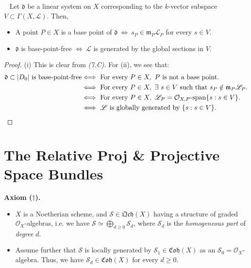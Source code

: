 \documentclass[11pt,a4paper,footinclude=true,headinclude=true]{scrbook} %
\newcommand{\LL}{\mathscr{L}}
\newcommand{\OO}{\mathcal{O}}
\newcommand{\Ss}{\mathscr{S}}
\newcommand{\dd}{\mathfrak{d}}
\newcommand{\mm}{\mathfrak{m}}
\newcommand{\<}{\langle}
\newcommand{\>}{\rangle}
\newcommand{\spn}{\mathchar`-\mathrm{span}}
\newcommand{\qcoh}{\mathfrak{Qch}}
\newcommand{\coh}{\mathfrak{Coh}}
\newenvironment{lemma}[2][]
{\renewcommand\theinnercustomlemma{#2}\innercustomlemma[#1]
\begin{mdframed}[backgroundcolor=gray!20]\ }
{\end{mdframed}\endinnercustomprop}
\newenvironment{axiom}[2][Axiom]
    { \begin{mdframed}[backgroundcolor=red!20] \textbf{#1 #2.} }
    {  \end{mdframed}}
\begin{document}
\begin{lemma}{7.8}
    Let $\dd$ be a linear system on $X$ corresponding to the $k$-vector subspace $V\subset\Gamma(X,\LL)$. Then,
    \begin{itemize}
        \item[(i)] A point $P\in X$ is a base point of $\dd\ \Longleftrightarrow\ s_P\in\mm_P\LL_P$ for every $s\in V$.
        \item[(ii)] $\dd$ is base-point-free  $\Longleftrightarrow\ \LL$ is generated by the global sections in $V$.
    \end{itemize}
\end{lemma}
\begin{proof}
    (i) This is clear from \textit{(7.C)}. For (ii), we see that:
    \begin{align*}
        \dd\subset|D_0|\ \text{is base-point-free} &\Longleftrightarrow\ \text{For every}\ P\in X,\ P\ \text{is not a base point}.\\  &\Longleftrightarrow\ \text{For every}\ P\in X,\ \exists\ s\in V\ \text{such that}\ s_P\notin\mm_P\LL_P.\\  &\Longleftrightarrow\ \text{For every}\ P\in X,\ \LL_P=\OO_{X,P}\spn\{s:s\in V\}.\\  &\Longleftrightarrow\ \LL\ \text{is globally generated by}\ \{s:s\in V\}.
    \end{align*}
\end{proof}
\newpage

\section{The Relative Proj \& Projective Space Bundles}
\begin{axiom}{($\dagger$)}
    \begin{itemize}
        \item $X$ is a Noetherian scheme, and $\Ss\in\qcoh(X)$ having a structure of graded $\OO_X$-algebras, i.e. we have $\Ss\simeq\bigoplus_{d\geq0}\Ss_d$, where $\Ss_d$ is the \textit{homogeneous part} of \textit{degree} $d$.
        \item Assume further that $\Ss$ is locally generated by $\Ss_1\in\coh(X)$ as an $\Ss_0=\OO_X$-algebra. Thus, we have $\Ss_d\in\coh(X)$ for every $d\geq0$.
    \end{itemize}
\end{axiom}
\end{document}
